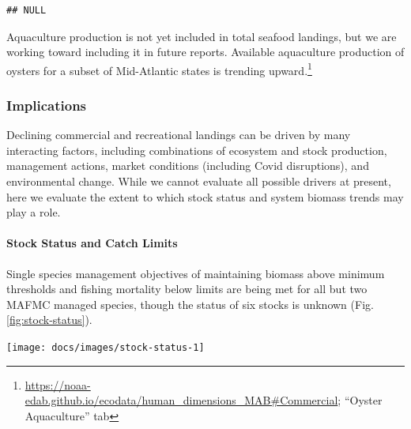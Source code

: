 \documentclass[
  10pt,
]{article}
\let\origfigure\figure
\let\endorigfigure\endfigure
\renewenvironment{figure}[1][2] {
    \expandafter\origfigure\expandafter[H]
} {
    \endorigfigure
}
\begin{document}
\begin{verbatim}
## NULL
\end{verbatim}

Aquaculture production is not yet included in total seafood landings,
but we are working toward including it in future reports. Available
aquaculture production of oysters for a subset of Mid-Atlantic states is
trending upward.\footnote{\url{https://noaa-edab.github.io/ecodata/human_dimensions_MAB\#Commercial};
  ``Oyster Aquaculture'' tab}

\hypertarget{implications}{%
\subsubsection{Implications}\label{implications}}

Declining commercial and recreational landings can be driven by many
interacting factors, including combinations of ecosystem and stock
production, management actions, market conditions (including Covid
disruptions), and environmental change. While we cannot evaluate all
possible drivers at present, here we evaluate the extent to which stock
status and system biomass trends may play a role.

\hypertarget{stock-status-and-catch-limits}{%
\paragraph{Stock Status and Catch
Limits}\label{stock-status-and-catch-limits}}

Single species management objectives of maintaining biomass above
minimum thresholds and fishing mortality below limits are being met for
all but two MAFMC managed species, though the status of six stocks is
unknown (Fig. \ref{fig:stock-status}).

\begin{figure}

{\centering \texttt{[image: docs/images/stock-status-1]} 

}

\caption{Summary of single species status for MAFMC and jointly federally managed stocks (Goosefish and Spiny dogfish). Stocks in green are below the biomass threshold (overfished), stocks in orange are above the biomass threshold but below the biomass target, and stocks in purple are above the biomass target. Only one stock, Atlantic mackerel, has fishing mortality above the limit (subject to overfishing).}\label{fig:stock-status}
\end{figure}
\end{document}

